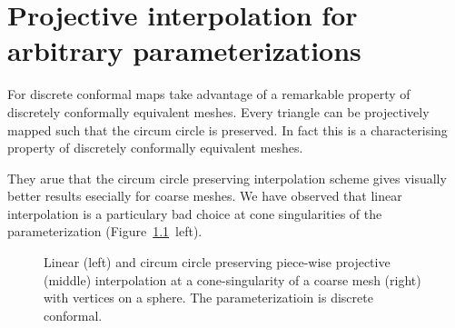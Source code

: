 \documentclass[Thesis.tex]{subfiles}
\begin{document}
\chapter[Projective interpolation for arbitrary parameterizations] %
{Projective interpolation for arbitrary parameterizations %
}

For discrete conformal maps \cite{Springborn2008} take advantage of a remarkable
property of discretely conformally equivalent meshes. Every triangle can be projectively 
mapped such that the circum circle is preserved. In fact this is a characterising property 
of discretely conformally equivalent meshes.

They arue that the circum circle preserving interpolation scheme gives visually better
results esecially for coarse meshes. We have observed that linear interpolation is a
particulary bad choice at cone singularities of the parameterization (Figure~\ref{fig:linear_projective_conformal}~left).

\begin{figure}
\centering
{}
\caption[Linear and projective interpolation]
{Linear (left) and circum circle preserving piece-wise projective (middle) interpolation 
at a cone-singularity of a coarse mesh (right) with vertices on a sphere. The parameterizatioin is discrete conformal.}
\label{fig:linear_projective_conformal} 
\end{figure}
\end{document}
